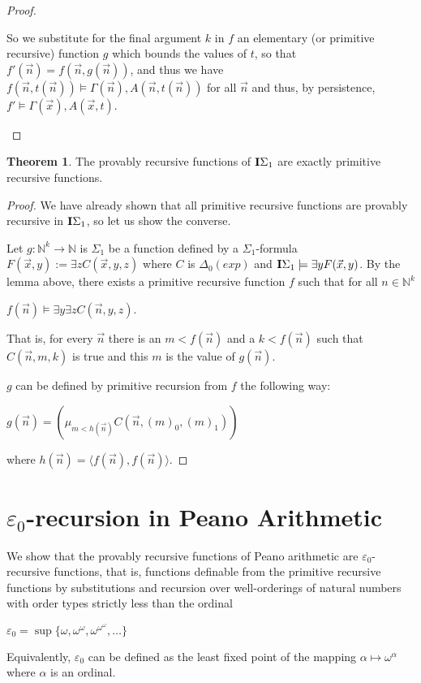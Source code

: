 \documentclass[8pt]{article}
\theoremstyle{definition}
\theoremstyle{definition}
\newtheorem{theorem}{Theorem}[section]
\theoremstyle{definition}
\theoremstyle{definition}
\theoremstyle{definition}
\theoremstyle{definition}
\theoremstyle{definition}
\theoremstyle{definition}
\theoremstyle{definition}
\theoremstyle{definition}
\theoremstyle{definition}
\theoremstyle{definition}
\theoremstyle{definition}
\theoremstyle{question}
\begin{document}
\begin{proof}
\begin{enumerate}
  So we substitute for the final argument $k$ in $f$ an elementary (or primitive recursive) function $g$
  which bounds the values of $t$, so that $f'(\vec{n}) = f(\vec{n}, g(\vec{n}))$, and thus
  we have $f(\vec{n}, t(\vec{n})) \models \Gamma(\vec{n}), A(\vec{n}, t(\vec{n}))$ for all $\vec{n}$ and thus, by persistence, $f' \models \Gamma(\vec{x}), A(\vec{x}, t)$.
\end{enumerate}
\end{proof}

\begin{theorem}
  The provably recursive functions of ${\bf I}\Sigma_1$ are exactly primitive recursive functions.
\end{theorem}

\begin{proof}
  We have already shown that all primitive recursive functions are provably recursive in ${\bf I}\Sigma_1$,
  so let us show the converse.

  Let $g : \mathbb{N}^k \to \mathbb{N}$ is $\Sigma_1$ be a function defined by a $\Sigma_1$-formula
  $F(\vec{x}, y) := \exists z C(\vec{x}, y, z)$ where $C$ is $\Delta_0(exp)$ and
  ${\bf I}\Sigma_1 \models \exists y F(\vec{x}, y)$.
  By the lemma above, there exists a primitive recursive function $f$ such that for all $n \in \mathbb{N}^k$
  \begin{center}
    $f(\vec{n}) \models \exists y \exists z C(\vec{n}, y, z)$.
  \end{center}
  That is, for every $\vec{n}$ there is an $m < f(\vec{n})$ and a $k < f(\vec{n})$
  such that $C(\vec{n}, m, k)$ is true and this $m$ is the value of $g(\vec{n})$.

  $g$ can be defined by primitive recursion from $f$ the following way:

  \begin{center}
    $g(\vec{n}) = (\mu_{m < h(\vec{n})} C(\vec{n}, (m)_0, (m)_1))$
  \end{center}
  where $h(\vec{n}) = \langle f(\vec{n}), f(\vec{n}) \rangle$.
\end{proof}

\section{$\varepsilon_0$-recursion in Peano Arithmetic}

We show that the provably recursive functions of Peano arithmetic are $\varepsilon_0$-recursive functions, that is, 
functions definable from the primitive recursive functions by substitutions and recursion over well-orderings
of natural numbers with order types strictly less than the ordinal
\begin{center}
  $\varepsilon_0 = \sup \{ \omega, \omega^{\omega}, \omega^{\omega^{\omega}}, \dots \}$
\end{center}
Equivalently, $\varepsilon_0$ can be defined as the least fixed point of the mapping $\alpha \mapsto \omega^{\alpha}$
where $\alpha$ is an ordinal.
\end{document}
